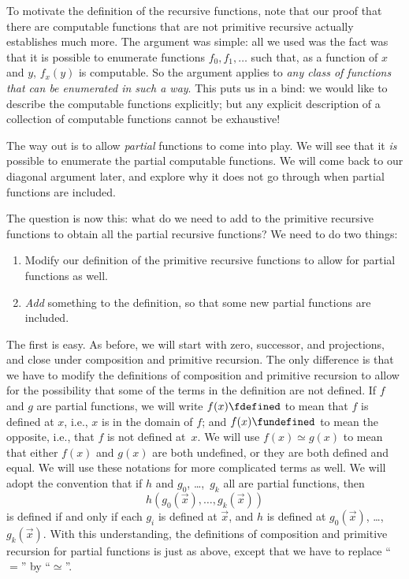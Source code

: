 \documentclass[../../../include/open-logic-section]{subfiles}
\begin{document}


To motivate the definition of the recursive functions, note that our
proof that there are computable functions that are not primitive
recursive actually establishes much more. The argument was
simple: all we used was the fact was that it is possible to enumerate
functions $f_0,f_1,\dots$ such that, as a function of $x$ and $y$,
$f_x(y)$ is computable. So the argument applies to \emph{any class of
  functions that can be enumerated in such a way}. This puts us in a
bind: we would like to describe the computable functions explicitly;
but any explicit description of a collection of computable functions
cannot be exhaustive!

The way out is to allow \emph{partial} functions to come into play. We
will see that it \emph{is} possible to enumerate the partial
computable functions. We will come back to our diagonal
argument later, and explore why it does not go through when partial
functions are included.

The question is now this: what do we need to add to the primitive
recursive functions to obtain all the partial recursive functions? We
need to do two things:
\begin{enumerate}
\item Modify our definition of the primitive recursive functions to
  allow for partial functions as well.
\item \emph{Add} something to the definition, so that some new partial
  functions are included.
\end{enumerate}

The first is easy. As before, we will start with zero, successor, and
projections, and close under composition and primitive recursion. The
only difference is that we have to modify the definitions of
composition and primitive recursion to allow for the possibility that
some of the terms in the definition are not defined. If $f$ and $g$
are partial functions, we will write $f(x) \fdefined$ to mean that $f$
is defined at $x$, i.e., $x$ is in the domain of $f$; and $f(x)
\fundefined$ to mean the opposite, i.e., that $f$ is not defined at~$x$.
We will use $f(x) \simeq g(x)$ to mean that either $f(x)$ and $g(x)$
are both undefined, or they are both defined and equal. We will use these
notations for more complicated terms as well. We will adopt the
convention that if $h$ and $g_0$, \dots,~$g_k$ all are partial functions,
then
\[
h(g_0(\vec x),\dots,g_k(\vec x))
\]
is defined if and only if each $g_i$ is defined at $\vec x$, and $h$
is defined at $g_0(\vec x)$, \dots,~$g_k(\vec x)$. With this
understanding, the definitions of composition and primitive recursion
for partial functions is just as above, except that we have to replace
``$=$'' by ``$\simeq$''.
\end{document}
